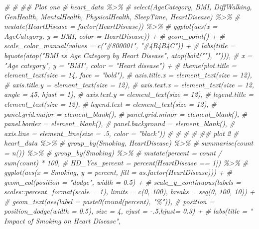 \documentclass[
]{article}
\newenvironment{Shaded}{\begin{snugshade}}{\end{snugshade}}
\newcommand{\CommentTok}[1]{\textcolor[rgb]{0.56,0.35,0.01}{\textit{#1}}}
\begin{document}
\begin{Shaded}
\begin{Highlighting}[]
\CommentTok{\# }
\CommentTok{\# \#\# Plot one}
\CommentTok{\# heart\_data \%\textgreater{}\%}
\CommentTok{\#   select(AgeCategory, BMI, DiffWalking, GenHealth, MentalHealth, PhysicalHealth, SleepTime, HeartDisease) \%\textgreater{}\%}
\CommentTok{\#   mutate(HeartDisease = factor(HeartDisease)) \%\textgreater{}\%}
\CommentTok{\#   ggplot(aes(x = AgeCategory, y = BMI, color = HeartDisease)) +}
\CommentTok{\#   geom\_point() +}
\CommentTok{\#   scale\_color\_manual(values = c("\#800001", "\#4B4B4C")) +}
\CommentTok{\#   labs(title = bquote(atop("BMI vs Age Category by Heart Disease", atop(bold(""), ""))),}
\CommentTok{\#        x = "Age category", y = "BMI", color = "Heart disease") +}
\CommentTok{\#   theme(plot.title = element\_text(size = 14, face = "bold"),}
\CommentTok{\#         axis.title.x = element\_text(size = 12),}
\CommentTok{\#         axis.title.y = element\_text(size = 12),}
\CommentTok{\#         axis.text.x = element\_text(size = 12, angle = 45, hjust = 1),}
\CommentTok{\#         axis.text.y = element\_text(size = 12),}
\CommentTok{\#         legend.title = element\_text(size = 12),}
\CommentTok{\#         legend.text = element\_text(size = 12),}
\CommentTok{\#         panel.grid.major = element\_blank(),}
\CommentTok{\#         panel.grid.minor = element\_blank(),}
\CommentTok{\#         panel.border = element\_blank(),}
\CommentTok{\#         panel.background = element\_blank(),}
\CommentTok{\#         axis.line = element\_line(size = .5, color = "black"))}
\CommentTok{\# }
\CommentTok{\# }
\CommentTok{\# }
\CommentTok{\# \#\# plot 2}
\CommentTok{\# heart\_data \%\textgreater{}\%}
\CommentTok{\#   group\_by(Smoking, HeartDisease) \%\textgreater{}\%}
\CommentTok{\#   summarise(count = n()) \%\textgreater{}\%}
\CommentTok{\#   group\_by(Smoking) \%\textgreater{}\%}
\CommentTok{\#   mutate(percent = count / sum(count) * 100,}
\CommentTok{\#          HD\_Yes\_percent = percent[HeartDisease == 1]) \%\textgreater{}\%}
\CommentTok{\#   ggplot(aes(x = Smoking, y = percent, fill = as.factor(HeartDisease))) +}
\CommentTok{\#   geom\_col(position = "dodge", width = 0.5) +}
\CommentTok{\#   scale\_y\_continuous(labels = scales::percent\_format(scale = 1), limits = c(0, 100), breaks = seq(0, 100, 10)) +}
\CommentTok{\#   geom\_text(aes(label = paste0(round(percent), "\%")), }
\CommentTok{\#             position = position\_dodge(width = 0.5), size = 4, vjust = {-}.5,hjust= 0.3) +}
\CommentTok{\#   labs(title = " Impact of Smoking on Heart Disease", }

\end{Highlighting}
\end{Shaded}
\end{document}
